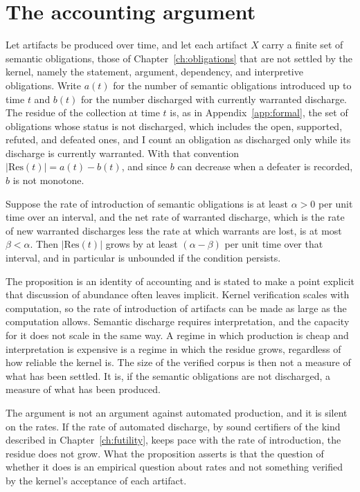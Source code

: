 \section{The accounting argument}

Let artifacts be produced over time, and let each artifact $X$ carry a finite set of semantic obligations, those of Chapter~\ref{ch:obligations} that are not settled by the kernel, namely the statement, argument, dependency, and interpretive obligations. Write $a(t)$ for the number of semantic obligations introduced up to time $t$ and $b(t)$ for the number discharged with currently warranted discharge. The residue of the collection at time $t$ is, as in Appendix~\ref{app:formal}, the set of obligations whose status is not discharged, which includes the open, supported, refuted, and defeated ones, and I count an obligation as discharged only while its discharge is currently warranted. With that convention $|\mathrm{Res}(t)| = a(t) - b(t)$, and since $b$ can decrease when a defeater is recorded, $b$ is not monotone.

\begin{proposition}
\label{prop:growth}
Suppose the rate of introduction of semantic obligations is at least $\alpha > 0$ per unit time over an interval, and the net rate of warranted discharge, which is the rate of new warranted discharges less the rate at which warrants are lost, is at most $\beta < \alpha$. Then $|\mathrm{Res}(t)|$ grows by at least $(\alpha - \beta)$ per unit time over that interval, and in particular is unbounded if the condition persists.
\end{proposition}

The proposition is an identity of accounting and is stated to make a point explicit that discussion of abundance often leaves implicit. Kernel verification scales with computation, so the rate of introduction of artifacts can be made as large as the computation allows. Semantic discharge requires interpretation, and the capacity for it does not scale in the same way. A regime in which production is cheap and interpretation is expensive is a regime in which the residue grows, regardless of how reliable the kernel is. The size of the verified corpus is then not a measure of what has been settled. It is, if the semantic obligations are not discharged, a measure of what has been produced.

The argument is not an argument against automated production, and it is silent on the rates. If the rate of automated discharge, by sound certifiers of the kind described in Chapter~\ref{ch:futility}, keeps pace with the rate of introduction, the residue does not grow. What the proposition asserts is that the question of whether it does is an empirical question about rates and not something verified by the kernel's acceptance of each artifact.

